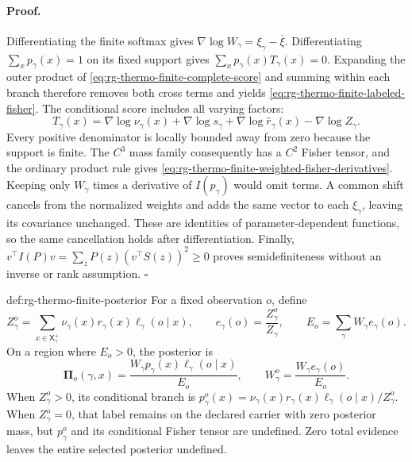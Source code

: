 \paragraph{Proof.}
Differentiating the finite softmax gives
$\nabla\log W_\gamma=\xi_\gamma-\overline\xi$.
Differentiating $\sum_xp_\gamma(x)=1$ on its fixed support gives
$\sum_xp_\gamma(x)T_\gamma(x)=0$. Expanding the outer product of
\cref{eq:rg-thermo-finite-complete-score} and summing within each branch
therefore removes both cross terms and yields
\cref{eq:rg-thermo-finite-labeled-fisher}. The conditional score includes
all varying factors:
\begin{equation}
 T_\gamma(x)=\nabla\log\nu_\gamma(x)
 +\nabla\log s_\gamma+\nabla\log\widehat r_\gamma(x)
 -\nabla\log Z_\gamma.
 \label{eq:rg-thermo-finite-branch-score}
\end{equation}
Every positive denominator is locally bounded away from zero because the
support is finite. The $C^3$ mass family consequently has a $C^2$ Fisher
tensor, and the ordinary product rule gives
\cref{eq:rg-thermo-finite-weighted-fisher-derivatives}.
Keeping only $W_\gamma$ times a derivative of $I(p_\gamma)$ would omit
terms. A common shift cancels from the normalized weights and adds the
same vector to each $\xi_\gamma$, leaving its covariance unchanged.
These are identities of parameter-dependent functions, so the same
cancellation holds after differentiation. Finally,
$v^\top I(P)v=\sum_zP(z)(v^\top S(z))^2\geq0$ proves semidefiniteness
without an inverse or rank assumption. $\square$

{def:rg-thermo-finite-posterior}
For a fixed observation $o$, define
\begin{equation}
 Z_\gamma^o=\sum_{x\in\mathsf X_\gamma^+}
              \nu_\gamma(x)r_\gamma(x)\ell_\gamma(o\mid x),
 \qquad e_\gamma(o)=\frac{Z_\gamma^o}{Z_\gamma},
 \qquad E_o=\sum_\gamma W_\gamma e_\gamma(o).
 \label{eq:rg-thermo-finite-evidence}
\end{equation}
On a region where $E_o>0$, the posterior is
\begin{equation}
 \boldsymbol\Pi_o(\gamma,x)
 =\frac{W_\gamma p_\gamma(x)\ell_\gamma(o\mid x)}{E_o},
 \qquad W_\gamma^o=\frac{W_\gamma e_\gamma(o)}{E_o}.
 \label{eq:rg-thermo-finite-posterior}
\end{equation}
When $Z_\gamma^o>0$, its conditional branch is
$p_\gamma^o(x)=\nu_\gamma(x)r_\gamma(x)\ell_\gamma(o\mid x)/Z_\gamma^o$.
When $Z_\gamma^o=0$, that label remains on the declared carrier with zero
posterior mass, but $p_\gamma^o$ and its conditional Fisher tensor are
undefined. Zero total evidence leaves the entire selected posterior
undefined. 

